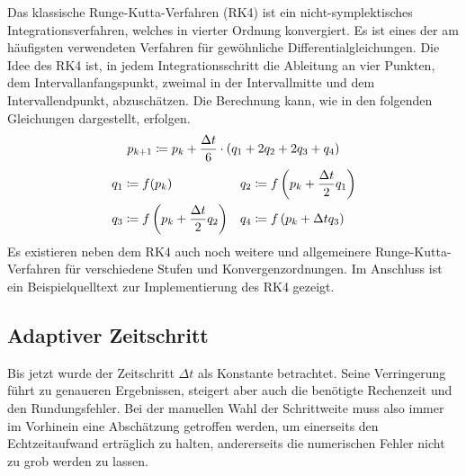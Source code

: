     Das klassische Runge-Kutta-Verfahren (RK4) ist ein nicht-symplektisches Integrationsverfahren, welches in vierter Ordnung konvergiert.
    Es ist eines der am häufigsten verwendeten Verfahren für gewöhnliche Differentialgleichungen.
    Die Idee des RK4 ist, in jedem Integrationsschritt die Ableitung an vier Punkten, dem Intervallanfangspunkt, zweimal in der Intervallmitte und dem Intervallendpunkt, abzuschätzen.
    Die Berechnung kann, wie in den folgenden Gleichungen dargestellt, erfolgen.
    \[
      p_{k+1} \coloneqq p_k + \frac{\Delta t}{6} \cdot (q_1 + 2q_2 + 2q_3 + q_4)
    \]
    \begin{align*}
      q_1 &\coloneqq f(p_k) & q_2 &\coloneqq f\left(p_k + \frac{\Delta t}{2}q_1\right) \\
      q_3 &\coloneqq f\left(p_k + \frac{\Delta t}{2}q_2\right) & q_4 &\coloneqq f\left(p_k + \Delta t q_3\right)
    \end{align*}
    Es existieren neben dem RK4 auch noch weitere und allgemeinere Runge-Kutta-Verfahren für verschiedene Stufen und Konvergenzordnungen.
    Im Anschluss ist ein Beispielquelltext zur Implementierung des RK4 gezeigt.
    \medskip
    \begin{tcolorbox}[colframe=black,colbacktitle=white,coltitle=black, attach boxed title to top center={yshift=-2mm},enhanced, titlerule=0.1pt, boxrule=0.5pt, arc=5pt,title=Quelltext:\quad Runge-Kutta-Integrator, breakable]
      
    \end{tcolorbox}


  \subsection{Adaptiver Zeitschritt} %
  \label{sub:adaptiver_zeitschritt}

    Bis jetzt wurde der Zeitschritt $\Delta t$ als Konstante betrachtet.
    Seine Verringerung führt zu genaueren Ergebnissen, steigert aber auch die benötigte Rechenzeit und den Rundungsfehler.
    Bei der manuellen Wahl der Schrittweite muss also immer im Vorhinein eine Abschätzung getroffen werden, um einerseits den Echtzeitaufwand erträglich zu halten, andererseits die numerischen Fehler nicht zu grob werden zu lassen.

